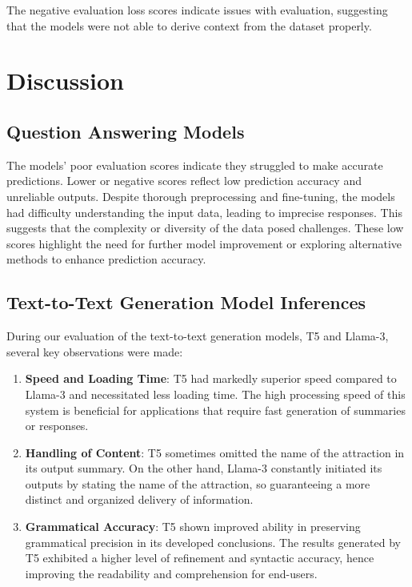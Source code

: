 \documentclass[conference]{IEEEtran}
\begin{document}
The negative evaluation loss scores indicate issues with evaluation, suggesting that the models were not able to derive context from the dataset properly.


\section{Discussion}

\subsection{Question Answering Models}

    The models' poor evaluation scores indicate they struggled to make accurate predictions. Lower or negative scores reflect low prediction accuracy and unreliable outputs. Despite thorough preprocessing and fine-tuning, the models had difficulty understanding the input data, leading to imprecise responses. This suggests that the complexity or diversity of the data posed challenges. These low scores highlight the need for further model improvement or exploring alternative methods to enhance prediction accuracy.

\subsection{Text-to-Text Generation Model Inferences}

        During our evaluation of the text-to-text generation models, T5 and Llama-3, several key observations were made:

        \begin{enumerate}
            \item \textbf{Speed and Loading Time}:
            T5 had markedly superior speed compared to Llama-3 and necessitated less loading time. The high processing speed of this system is beneficial for applications that require fast generation of summaries or responses.

            \item \textbf{Handling of Content}:
            T5 sometimes omitted the name of the attraction in its output summary. On the other hand, Llama-3 constantly initiated its outputs by stating the name of the attraction, so guaranteeing a more distinct and organized delivery of information.

            \item \textbf{Grammatical Accuracy}:
            T5 shown improved ability in preserving grammatical precision in its developed conclusions. The results generated by T5 exhibited a higher level of refinement and syntactic accuracy, hence improving the readability and comprehension for end-users.

        \end{enumerate}
\end{document}
